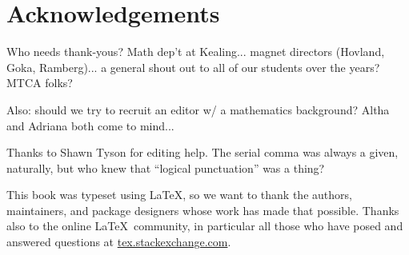 \chapter{Acknowledgements}
\label{ch:acknowledgements}

Who needs thank-yous? Math dep't at Kealing... magnet directors (Hovland, Goka, Ramberg)... a general shout out to all of our students over the years? MTCA folks?

Also: should we try to recruit an editor w/ a mathematics background? Altha and Adriana both come to mind...

Thanks to Shawn Tyson for editing help. The serial comma was always a given, naturally, but who knew that ``logical punctuation'' was a thing?

This book was typeset using \LaTeX, so we want to thank the authors, maintainers, and package designers whose work has made that possible. Thanks also to the online \LaTeX\ community, in particular all those who have posed and answered questions at \href{http://tex.stackexchange.com/}{tex.stackexchange.com}.
